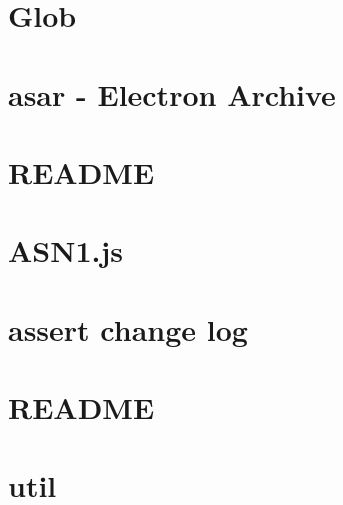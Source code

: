 \documentclass[twoside]{book}
\newcommand{\+}{\discretionary{\mbox{\scriptsize$\hookleftarrow$}}{}{}}
\begin{document}
\chapter{Glob}
\label{md_dsmacc_examples_DRmerge_node_modules_asar_node_modules_glob_README}

\chapter{asar -\/ Electron Archive}
\label{md_dsmacc_examples_DRmerge_node_modules_asar_README}

\chapter{R\+E\+A\+D\+ME}
\label{md_dsmacc_examples_DRmerge_node_modules_asn1_README}

\chapter{A\+S\+N1.\+js}
\label{md_dsmacc_examples_DRmerge_node_modules_asn1_8js_README}

\chapter{assert change log}
\label{md_dsmacc_examples_DRmerge_node_modules_assert_CHANGELOG}

\chapter{R\+E\+A\+D\+ME}
\label{md_dsmacc_examples_DRmerge_node_modules_assert_node_modules_inherits_README}

\chapter{util}
\label{md_dsmacc_examples_DRmerge_node_modules_assert_node_modules_util_README}

\end{document}

